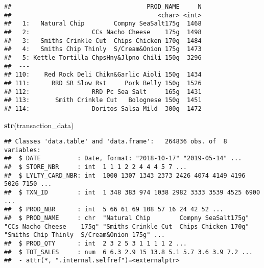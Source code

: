 \documentclass[
]{article}
\newenvironment{Shaded}{\begin{snugshade}}{\end{snugshade}}
\newcommand{\AttributeTok}[1]{\textcolor[rgb]{0.13,0.29,0.53}{#1}}
\newcommand{\FunctionTok}[1]{\textcolor[rgb]{0.13,0.29,0.53}{\textbf{#1}}}
\newcommand{\NormalTok}[1]{#1}
\newcommand{\OtherTok}[1]{\textcolor[rgb]{0.56,0.35,0.01}{#1}}
\newcommand{\SpecialCharTok}[1]{\textcolor[rgb]{0.81,0.36,0.00}{\textbf{#1}}}
\newcommand{\StringTok}[1]{\textcolor[rgb]{0.31,0.60,0.02}{#1}}
\begin{document}
\begin{Shaded}
\end{Shaded}

\begin{verbatim}
##                                     PROD_NAME     N
##                                        <char> <int>
##   1:   Natural Chip        Compny SeaSalt175g  1468
##   2:                 CCs Nacho Cheese    175g  1498
##   3:   Smiths Crinkle Cut  Chips Chicken 170g  1484
##   4:   Smiths Chip Thinly  S/Cream&Onion 175g  1473
##   5: Kettle Tortilla ChpsHny&Jlpno Chili 150g  3296
##  ---                                               
## 110:    Red Rock Deli Chikn&Garlic Aioli 150g  1434
## 111:      RRD SR Slow Rst     Pork Belly 150g  1526
## 112:                 RRD Pc Sea Salt     165g  1431
## 113:       Smith Crinkle Cut   Bolognese 150g  1451
## 114:                 Doritos Salsa Mild  300g  1472
\end{verbatim}

\begin{Shaded}
\begin{Highlighting}[]
\FunctionTok{str}\NormalTok{(transaction\_data)}
\end{Highlighting}
\end{Shaded}

\begin{verbatim}
## Classes 'data.table' and 'data.frame':   264836 obs. of  8 variables:
##  $ DATE          : Date, format: "2018-10-17" "2019-05-14" ...
##  $ STORE_NBR     : int  1 1 1 2 2 4 4 4 5 7 ...
##  $ LYLTY_CARD_NBR: int  1000 1307 1343 2373 2426 4074 4149 4196 5026 7150 ...
##  $ TXN_ID        : int  1 348 383 974 1038 2982 3333 3539 4525 6900 ...
##  $ PROD_NBR      : int  5 66 61 69 108 57 16 24 42 52 ...
##  $ PROD_NAME     : chr  "Natural Chip        Compny SeaSalt175g" "CCs Nacho Cheese    175g" "Smiths Crinkle Cut  Chips Chicken 170g" "Smiths Chip Thinly  S/Cream&Onion 175g" ...
##  $ PROD_QTY      : int  2 3 2 5 3 1 1 1 1 2 ...
##  $ TOT_SALES     : num  6 6.3 2.9 15 13.8 5.1 5.7 3.6 3.9 7.2 ...
##  - attr(*, ".internal.selfref")=<externalptr>
\end{verbatim}
\end{document}
